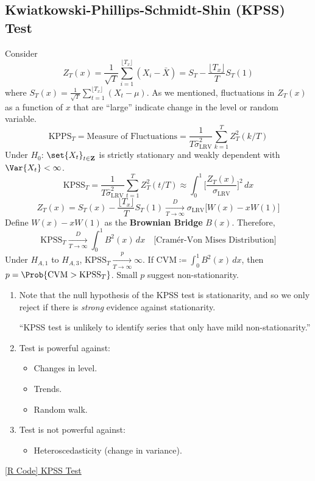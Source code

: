 \subsection*{Kwiatkowski-Phillips-Schmidt-Shin (KPSS) Test}
Consider
\[ Z_T(x)=\frac{1}{\sqrt{T}} \sum_{i=1}^{\lfloor T_x \rfloor} (X_i-\bar{X})=S_T-\frac{\lfloor T_x\rfloor}{T}S_T(1)  \]
where $ S_T(x)=\frac{1}{\sqrt{T}} \sum_{t=1}^{\lfloor T_x\rfloor} (X_t-\mu) $. As we mentioned,
fluctuations in $ Z_T(x) $ as a function of $ x $ that are ``large'' indicate change in the
level or random variable.
\[ \text{KPPS}_T=\text{Measure of Fluctuations}=\frac{1}{T\hat{\sigma}^2_{\text{LRV}}}\sum_{k=1}^{T} Z_T^2(k/T)  \]
Under $ H_0 $: $ \set{X_t}_{t\in\mathbf{Z}} $ is strictly stationary and weakly dependent
with $ \Var{X_t}<\infty $.
\[ \text{KPSS}_T=\frac{1}{T\hat{\sigma}_{\text{LRV}}^2}\sum_{t=1}^{T} Z_T^2(t/T)\approx
    \int_{0}^1 \biggl[\frac{Z_T(x)}{\sigma_{\text{LRV}}}\biggr]^{2}\, dx   \]
\[ Z_T(x)=S_T(x)-\frac{\lfloor T_x\rfloor}{T}S_T(1)\xrightarrow[T\to\infty]{D}
    \sigma_{\text{LRV}}\bigl[W(x)-x W(1)\bigr]  \]
Define $ W(x)-x W(1) $ as the \textbf{Brownian Bridge} $ B(x) $. Therefore,
\[ \text{KPSS}_T\xrightarrow[T\to\infty]{D}\int_0^1 B^2(x)\, dx\quad\text{[Cramér-Von Mises Distribution]} \]
Under $ H_{A,1} $ to $ H_{A,3} $, $ \text{KPSS}_T\xrightarrow[T\to\infty]{p}\infty $. If
$ \text{CVM}\coloneq \int_{0}^{1} B^2(x)\, d{x} $,
then $ p=\Prob{\text{CVM}>\text{KPSS}_T} $. Small $ p $ suggest non-stationarity.
\begin{Remark}{}{}
    \begin{enumerate}[(1)]
        \item Note that the null hypothesis of the KPSS test is stationarity, and so we only
              reject if there is \emph{strong} evidence against stationarity.

              ``KPSS test is unlikely to identify series that only have mild non-stationarity.''
        \item Test is powerful against:
              \begin{itemize}
                  \item Changes in level.
                  \item Trends.
                  \item Random walk.
              \end{itemize}
        \item Test is not powerful against:
              \begin{itemize}
                  \item Heteroscedasticity (change in variance).
              \end{itemize}
    \end{enumerate}
\end{Remark}
\href{https://github.com/Hextical/university-notes/blob/master/year-3/semester-2/STAT 443/code/10.5 - KPSS Test.R}{[R Code] KPSS Test}
